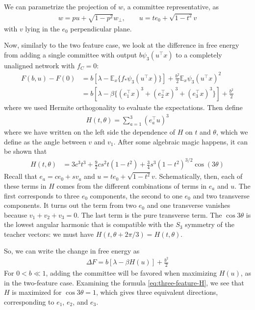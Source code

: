 \documentclass[11pt, reqno]{amsart}
\theoremstyle{notestyle}
\theoremstyle{defstyle}
\begin{document}
We can parametrize the projection of $w$, a committee representative, as
\begin{align*}
    w = pu + \sqrt{1-p^2}w_\perp,
    \qquad u = t e_0 + \sqrt{1-t^2} v
\end{align*}
with $v$ lying in the $e_0$ perpendicular plane.

Now, similarly to the two feature case, we look at the difference in free energy from adding a single committee with output $b \psi_3 (u^\top x)$ to a completely unaligned network with $f_C = 0$:
\begin{align*}
    F(b, u) - F(0)
    &= b \left[\lambda - \mathbb{E}_x \{f_* \psi_3 (u^\top x)\} \right]
    + \frac{b^2}{2} \mathbb{E}_x \psi_3 (u^\top x)^2 \\
    &= b \left[ \lambda - \beta \{ (e_1^\top x)^3 + (e_2^\top x)^3 + (e_3^\top x)^3 \} 
    \right] + \frac{b^2}{2}
\end{align*}
where we used Hermite orthogonality to evaluate the expectations.
Then define
\begin{align*}
    H(t, \theta) = \sum_{a=1}^3 (e_a^\top u)^3
\end{align*}
where we have written on the left side the dependence of $H$ on $t$ and $\theta$, which we define as the angle between $v$ and $v_1$.
After some algebraic magic happens, it can be shown that
\begin{align}\label{eq:three-feature-H}
    H(t, \theta)
    &= 3c^3 t^3
    + \frac{9}{2} cs^2 t (1-t^2)
    + \frac{3}{4} s^3 (1-t^2)^{3/2} \cos (3\theta)
\end{align}
Recall that $e_a = c e_0 + s v_a$ and $u = t e_0 + \sqrt{1-t^2}v$.
Schematically, then, each of these terms in $H$ comes from the different combinations of terms in $e_a$ and $u$.
The first corresponds to three $e_0$ components, the second to one $e_0$ and two transverse components.
It turns out the term from two $e_0$ and one transverse vanishes because $v_1 + v_2 + v_3 = 0$. 
The last term is the pure transverse term.
The $\cos 3\theta$ is the lowest angular harmonic that is compatible with the $S_3$ symmetry of the teacher vectors: we must have $H(t, \theta + 2\pi/3) = H(t, \theta)$.

So, we can write the change in free energy as
\begin{align*}
    \Delta F
    = b \left[\lambda - \beta H(u) \right] + \frac{b^2}{2}
\end{align*}
For $0 < b \ll 1$, adding the committee will be favored when maximizing $H(u)$, as in the two-feature case.
Examining the formula \ref{eq:three-feature-H}, we see that $H$ is maximized for $\cos 3\theta = 1$, which gives three equivalent directions, corresponding to $e_1$, $e_2$, and $e_3$.
\end{document}
